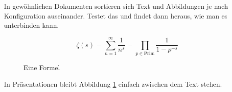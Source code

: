 
\begin{frame}
	In gewöhnlichen Dokumenten sortieren sich Text und Abbildungen je nach Konfiguration auseinander. Testet das und findet dann heraus, wie man es unterbinden kann.
	\begin{figure}
	$$ \zeta(s)
		= \sum_{n=1}^\infty \frac{1}{n^s}
		= \prod_{p \in \text{Prim}} \frac{1}{1-p^{-s}}
	$$
	\caption{Eine Formel}
	\label{eq:first}
	\end{figure}
	In Präsentationen bleibt Abbildung \ref{eq:first} einfach zwischen dem Text stehen.
\end{frame}
